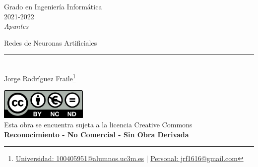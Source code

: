 \documentclass[12pt, twoside, openright]{report} %
\begin{document}

\begin{titlepage}
	\begin{sffamily}
		\color{azulUC3M}
		\begin{center}
			\begin{figure}[H] %
			\end{figure}
			\vspace{2.5cm}
			\begin{Large}
				Grado en Ingeniería Informática\\
				2021-2022\\
				\vspace{2cm}
				\textsl{Apuntes}\\
				\bigskip
			\end{Large}
			{\Huge Redes de Neuronas Artificiales}\\
			\vspace*{0.5cm}
			\rule{10.5cm}{0.1mm}\\
			\vspace*{0.9cm}
			{\LARGE Jorge Rodríguez Fraile\footnote{\href{mailto:100405951@alumnos.uc3m.es}{Universidad: 100405951@alumnos.uc3m.es}  |  \href{mailto:jrf1616@gmail.com}{Personal: jrf1616@gmail.com}}}\\
			\vspace*{1cm}
		\end{center}
		\vfill
		\color{black}
		\includegraphics[width=4.2cm]{img/creativecommons.png}\\
		Esta obra se encuentra sujeta a la licencia Creative Commons\\ \textbf{Reconocimiento - No Comercial - Sin Obra Derivada}
	\end{sffamily}
\end{titlepage}


\tableofcontents
\thispagestyle{fancy}
\end{document}
